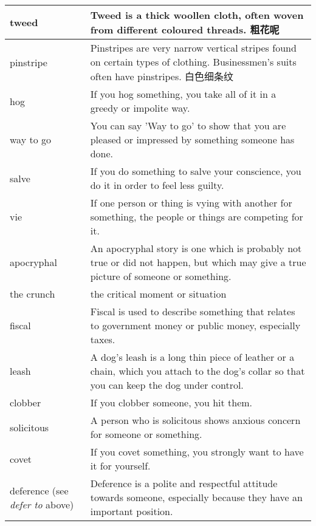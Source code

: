 \documentclass{article}
\begin{document}
\begin{center}
\begin{longtable}{|l|p{9cm}|}
\hline
tweed
&
Tweed is a thick woollen cloth, often woven from different coloured threads. 粗花呢
\\

\hline
pinstripe
&
Pinstripes are very narrow vertical stripes found on certain types of clothing. Businessmen's suits often have pinstripes. 白色细条纹
\\

\hline
hog
&
If you hog something, you take all of it in a greedy or impolite way.
\\

\hline
way to go
&
You can say 'Way to go' to show that you are pleased or impressed by something someone has done.
\\

\hline
salve
&
If you do something to salve your conscience, you do it in order to feel less guilty.
\\

\hline
vie
&
If one person or thing is vying with another for something, the people or things are competing for it.
\\

\hline
apocryphal
&
An apocryphal story is one which is probably not true or did not happen, but which may give a true picture of someone or something.
\\

\hline
the crunch
&
the critical moment or situation
\\

\hline
fiscal
&
Fiscal is used to describe something that relates to government money or public money, especially taxes.
\\

\hline
leash
&
A dog's leash is a long thin piece of leather or a chain, which you attach to the dog's collar so that you can keep the dog under control.
\\

\hline
clobber
&
If you clobber someone, you hit them.
\\

\hline
solicitous
&
A person who is solicitous shows anxious concern for someone or something.
\\

\hline
covet
&
If you covet something, you strongly want to have it for yourself.
\\

\hline
deference (see \textit{defer to} above)
&
Deference is a polite and respectful attitude towards someone, especially because they have an important position.
\\


\end{longtable}
\end{center}
\end{document}
